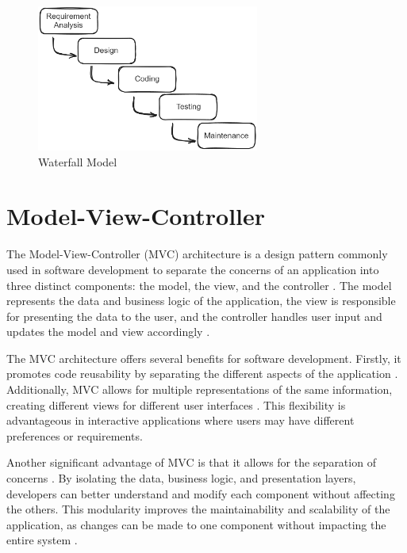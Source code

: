 \begin{figure}[!ht]
    \centering
    \includegraphics[width=0.65\textwidth]{texs/Part2/chapter1/image/waterfall.png}
    \caption{Waterfall Model}
    \label{fig:waterfall-model}
\end{figure}


\section{Model-View-Controller}
\label{sec:model-view-controller}

The Model-View-Controller (MVC) architecture is a design pattern commonly used in software development to separate the concerns of an application into three distinct components: the model, the view, and the controller \cite[47]{Garca2023}. The model represents the data and business logic of the application, the view is responsible for presenting the data to the user, and the controller handles user input and updates the model and view accordingly \cite{sarker14}.

The MVC architecture offers several benefits for software development. Firstly, it promotes code reusability by separating the different aspects of the application \cite{sarker14}. Additionally, MVC allows for multiple representations of the same information, creating different views for different user interfaces \cite{sarker14}. This flexibility is advantageous in interactive applications where users may have different preferences or requirements.

Another significant advantage of MVC is that it allows for the separation of concerns \cite{Stepien}. By isolating the data, business logic, and presentation layers, developers can better understand and modify each component without affecting the others. This modularity improves the maintainability and scalability of the application, as changes can be made to one component without impacting the entire system \cite{Kozon_2023}.

